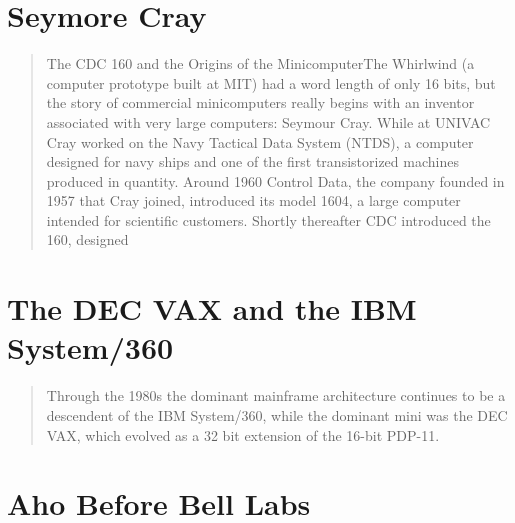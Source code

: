 \section{Seymore Cray}
\begin{quotation}
    The CDC 160 and the Origins of the MinicomputerThe Whirlwind (a computer prototype built at 
MIT) had a word length of only 16 bits, but the story of commercial minicomputers really begins with 
an inventor associated with very large computers: Seymour Cray. While at UNIVAC Cray worked on the 
Navy Tactical Data System (NTDS), a computer designed for navy ships and one of the first 
transistorized machines produced in quantity. Around 1960 Control Data, the company founded in 1957 
that Cray joined, introduced its model 1604, a large computer intended for scientific customers. 
Shortly thereafter CDC introduced the 160, designed
\cite{nothing_new_since_von_neumann_2000}
\end{quotation}
\section{The DEC VAX and the IBM System/360}
\begin{quotation}
    Through the 1980s the dominant mainframe architecture continues to be a descendent of the IBM 
System/360, while the dominant mini was the DEC VAX, which evolved as a 32 bit extension of the 
16-bit PDP-11.
\cite{nothing_new_since_von_neumann_2000}
\end{quotation}
\section{Aho Before Bell Labs}
